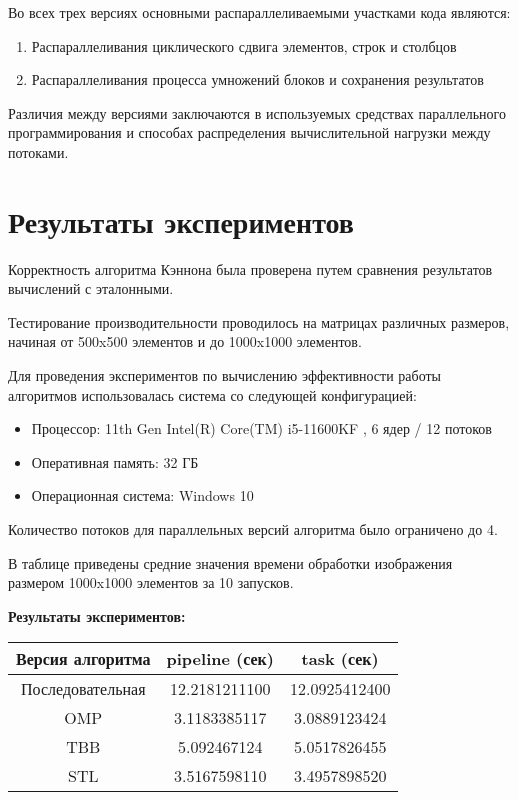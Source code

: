 \documentclass{report}
\begin{document}
Во всех трех версиях основными распараллеливаемыми участками кода являются:
\begin{enumerate}
\item Распараллеливания циклического сдвига элементов, строк и столбцов
\item Распараллеливания процесса умножений блоков и сохранения результатов
\end{enumerate}

Различия между версиями заключаются в используемых средствах параллельного программирования и способах распределения вычислительной нагрузки между потоками.

\newpage

\section*{Результаты экспериментов}
\par Корректность алгоритма Кэннона была проверена путем сравнения результатов вычислений с эталонными.
\par Тестирование производительности проводилось на матрицах различных размеров, начиная от 500x500 элементов и до 1000x1000 элементов.
\par Для проведения экспериментов по вычислению эффективности работы алгоритмов использовалась система со следующей конфигурацией:
\begin{itemize}
\item Процессор: 11th Gen Intel(R) Core(TM) i5-11600KF , 6 ядер / 12 потоков
\item Оперативная память: 32 ГБ
\item Операционная система: Windows 10
\end{itemize}
\par Количество потоков для параллельных версий алгоритма было ограничено до 4.
\par В таблице приведены средние значения времени обработки изображения размером 1000x1000 элементов за 10 запусков.
\par \textbf{Результаты экспериментов:}
\begin{center}
\begin{tabular}{ ||c | c | c ||  }
    \hline Версия алгоритма & pipeline (сек) & task (сек)\\ 
    \hline Последовательная & 12.2181211100 & 12.0925412400 \\
    \hline OMP & 3.1183385117 & 3.0889123424 \\
    \hline TBB & 5.092467124 & 5.0517826455 \\ 
    \hline STL & 3.5167598110 & 3.4957898520 \\ 
    \hline
\end{tabular}\\[5mm]
\end{center}
\end{document}
